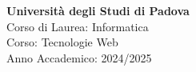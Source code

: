 \begin{minipage}[]{0.3\textwidth}
 
\end{minipage}
\hspace{0.05\textwidth}
\begin{minipage}[]{0.65\textwidth}
  \textcolor{unipd}{
    \textbf{Università degli Studi di Padova} \\
    Corso di Laurea: Informatica \\
    Corso: Tecnologie Web \\
    Anno Accademico: 2024/2025
  }
\end{minipage}

\bigskip
\bigskip
\bigskip